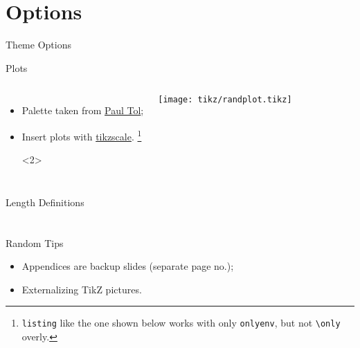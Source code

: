 \documentclass[t]{beamer}
\newcommand{\inptikz}[1]{%
  \tikzsetnextfilename{#1}%
}
\begin{document}
\section{Options}
\begin{frame}{Theme Options}
\end{frame}

\begin{frame}[fragile]{Plots}
  \begin{columns}[T]
    \begin{itemize}
      \item Palette taken from \href{https://personal.sron.nl/~pault/#sec:qualitative}{Paul Tol};
      \item <2-> Insert plots with \href{https://ctan.org/pkg/tikzscale?lang=en}{tikzscale}.%
      \footnote{\texttt{listing} like the one shown below works with only \texttt{onlyenv}, but not \texttt{\textbackslash{}only} overly.}%
        \begin{onlyenv}<2>
      \end{onlyenv}
    \end{itemize}
    \texttt{[image: tikz/randplot.tikz]}
  \end{columns}
\end{frame}

\begin{frame}{Length Definitions}
\end{frame}

\appendix
\section*{}

\begin{frame}[fragile]{Random Tips}
\begin{itemize}
  \item Appendices are backup slides (separate page no.);
  \item Externalizing TikZ pictures.%
  \begin{dotlst}[%
    listing side comment,righthand ratio=0.38,comment={\inptikz{onsager}}
    ]
\usepackage{tikz}
\usepackage[most]{tcolorbox}
\usetikzlibrary{external}
\tikzexternalize[prefix=build/]
\newcommand{\inptikz}[1]{%
  \tikzsetnextfilename{#1}%
}
  \end{dotlst}
\end{itemize}
\end{frame}
\end{document}
